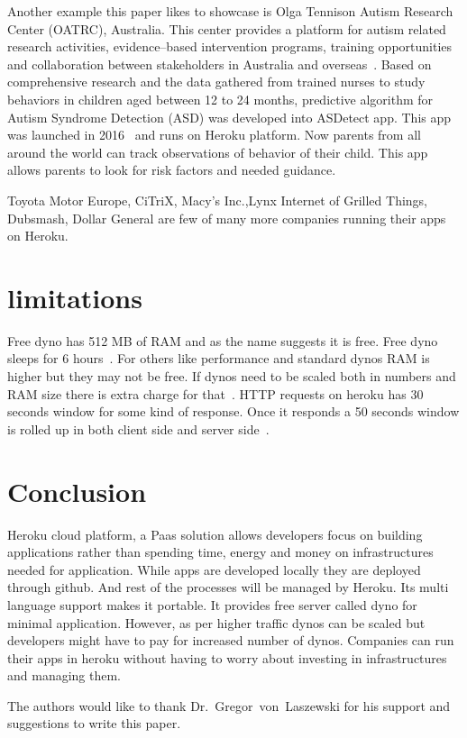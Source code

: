  Another example this paper likes to showcase is Olga Tennison Autism Research
 Center (OATRC), Australia. This center provides a platform for autism related
 research activities, evidence--based intervention programs, training
 opportunities and collaboration between stakeholders in Australia and
 overseas~\cite{hid-sp18-415-www-customers-heroku-com}. Based on comprehensive research and
 the data gathered from trained nurses to study behaviors in children aged 
 between 12 to 24 months, predictive algorithm for Autism Syndrome Detection (ASD)
 was developed into ASDetect app. This app was launched in 
 2016~\cite{hid-sp18-415-www-customers-heroku-com} and runs on Heroku platform. Now parents
 from all around the world can track observations of behavior of their child.
 This app allows parents to look for risk factors and needed guidance.

 Toyota Motor Europe, CiTriX, Macy's Inc.,Lynx Internet of Grilled Things,
 Dubsmash, Dollar General are few of many more companies running their apps
 on Heroku.


\section{limitations}
 Free dyno has 512 MB of RAM and as the name suggests it is free. Free dyno
 sleeps for 6 hours~\cite{hid-sp18-415-www-how-heroku-works}. For others like performance
 and standard dynos RAM is higher but they may not be free. If dynos need to
 be scaled both in numbers and RAM size there is extra charge for
 that~\cite{hid-sp18-415-www-how-heroku-works}. HTTP requests on heroku has 30 seconds
 window for some kind of response. Once it responds a 50 seconds window is
 rolled up in both client side and server side~\cite{hid-sp18-415-www-devcenter-herokulimits}.

\section{Conclusion}

 Heroku cloud platform, a Paas solution allows developers focus on building 
 applications rather than spending time, energy and money on infrastructures
 needed for application. While apps are developed locally they are deployed
 through github. And rest of the processes will be managed by Heroku. Its
 multi language support makes it portable. It provides free server called dyno
 for minimal application. However, as per higher traffic dynos can be scaled but
 developers might have to pay for increased number of dynos. Companies can run
 their apps in heroku without having to worry about investing in infrastructures
 and managing them.


\begin{acks}

  The authors would like to thank Dr.~Gregor~von~Laszewski for his
  support and suggestions to write this paper.

\end{acks}


 

